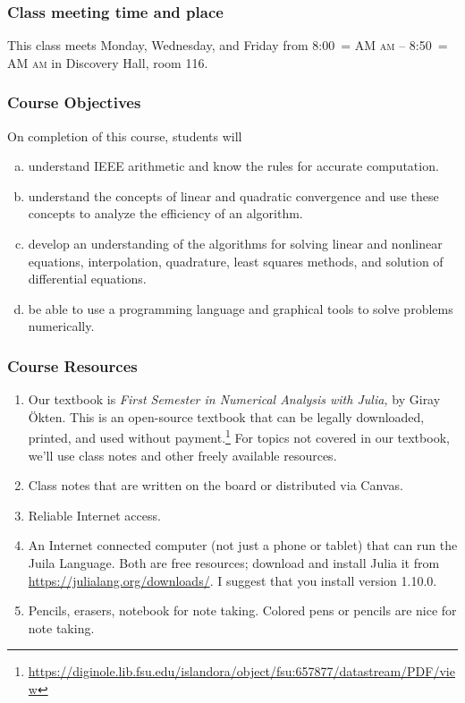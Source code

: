 \documentclass[12pt]{article}
\makeatletter
\newcounter{ex}\setcounter{ex}{0}
\newenvironment{alphalist}{
  \begin{enumerate}[(a)]
    \addtolength{\itemsep}{-0.5\itemsep}}
  {\end{enumerate}}
\DeclareRobustCommand{\maybefakesc}[1]{%
  \ifnum\pdfstrcmp{\f@series}{\bfdefault}=\z@
    {\fontsize{\dimexpr0.8\dimexpr\f@size pt\relax}{0}\selectfont\uppercase{#1}}%
  \else
    \textsc{#1}%
  \fi
}
\newcommand\AM{\,\maybefakesc{am}\xspace}
\newcommand{\room}{Discovery Hall, room  116}
\newcommand{\meetingtime}{This class meets Monday, Wednesday, and Friday  from 
	8:00\AM -- 8:50\AM}
\makeatother
\begin{document}
\subsubsection*{Class meeting time and place}

\meetingtime in \room.


\subsubsection*{Course Objectives}

On completion of this course, students will
\begin{alphalist}
    \item understand IEEE arithmetic and know the rules for accurate computation.
    \item understand the concepts of linear and quadratic convergence and use these concepts to analyze 
        the efficiency of an algorithm.
    \item develop an understanding of the algorithms for solving linear and nonlinear equations, interpolation, 
       quadrature, least squares methods, and solution of differential equations.
    \item be able to use a programming language and graphical tools to solve problems numerically.
\end{alphalist}
 

\subsubsection*{Course Resources}

\begin{enumerate}

\item Our textbook is \emph{First Semester in Numerical Analysis with Julia,} by Giray Ökten.  This is an open-source textbook that can be legally downloaded, printed, and  used without payment.\footnote{\tiny
\url{https://diginole.lib.fsu.edu/islandora/object/fsu:657877/datastream/PDF/view} \normalsize} For topics not covered in our textbook, we'll use class notes and other freely available resources.

\item Class notes that are written on the board or distributed via Canvas.

\item Reliable Internet access.

\item  An Internet connected computer (not just a phone or tablet) that can run the Juila Language.  Both are free resources; download and install Julia it from \url{https://julialang.org/downloads/}.  I suggest that you install version 1.10.0.


\item Pencils, erasers, notebook for note taking. Colored pens or pencils are nice for note taking.


 \end{enumerate}
\end{document}
